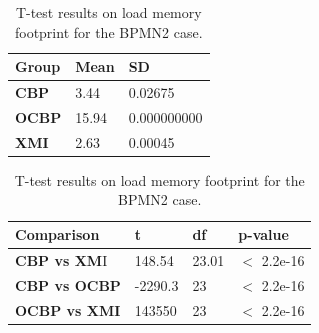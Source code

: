 \documentclass{llncs}
\begin{document}
\begin{table}[ht]
    \centering
    \label{table:ttest_load_memory_bpmn2}
    \caption{T-test results on load memory footprint for the BPMN2 case.}
    \begin{minipage}{0.44\textwidth}
        \centering
        \begin{tabular}{|p{}|p{}|p{}|}
            \hline 
            \textbf{Group}  & \textbf{Mean} & \textbf{SD} \\ 
            \hline 
            \textbf{CBP} & 3.44  & 0.02675 \\ 
            \hline 
            \textbf{OCBP} & 15.94 & 0.000000000  \\ 
            \hline 
            \textbf{XMI} & 2.63   & 0.00045\\ 
            \hline 
        \end{tabular} 
    \end{minipage}
    \hfill
    \begin{minipage}{0.54\textwidth}
        \centering
     \begin{tabular}{|p{}|p{}|p{}|p{}|}
            \hline 
            \textbf{Comparison} & \textbf{t}  & \textbf{df} & \textbf{p-value} \\ 
            \hline 
            \textbf{CBP vs XM}I & 148.54  & 23.01 & $<$ 2.2e-16 \\ 
            \hline 
            \textbf{CBP vs OCBP} & -2290.3 & 23 & $<$ 2.2e-16 \\ 
            \hline 
            \textbf{OCBP vs XMI} & 143550   & 23  & $<$ 2.2e-16 \\ 
            \hline 
        \end{tabular} 
    \end{minipage}
\end{table}
\end{document}
